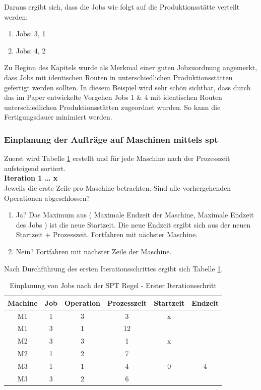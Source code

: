 \documentclass[final, english, ngerman, a4paper, 12pt, %
numbers=noenddot,
cd=true,
cdfont=false,cdfont=nohead,cdfont=nodin,
cdmath=false,
cdhead=false,
cdfoot=true,
cdcover=monochrome,
cdgeometry=symmetric,
declaration=heading,
declaration=notoc,
abstract=heading,
]{tudscrreprt}
\begin{document}
\noindent
Daraus ergibt sich, dass die Jobs wie folgt auf die Produktionsstätte verteilt werden:
\begin{enumerate}
	\item Jobs: {3, 1}
	\item Jobs: {4, 2}
\end{enumerate}

\noindent
Zu Beginn des Kapitels wurde als Merkmal einer guten Jobzuordnung angemerkt, dass Jobs mit identischen Routen in unterschiedlichen Produktionsstätten gefertigt werden sollten. In diesem Beispiel wird sehr schön sichtbar, dass durch das im Paper entwickelte Vorgehen Jobs 1 \& 4 mit identischen Routen unterschiedlichen Produktionsstätten zugeordnet wurden. So kann die Fertigungsdauer minimiert werden.

\subsubsection{Einplanung der Aufträge auf Maschinen mittels \gls{spt} }
Zuerst wird Tabelle \ref{tab:spt1} erstellt und für jede Maschine nach der Prozesszeit aufsteigend sortiert. \\

\noindent
\textbf{Iteration 1 … x} \\
\noindent
Jeweils die erste Zeile pro Maschine betrachten. Sind alle vorhergehenden Operationen abgeschlossen?

\begin{enumerate}
	\item Ja? Das Maximum aus ( Maximale Endzeit der Maschine, Maximale Endzeit des Jobs ) ist die neue Startzeit. Die neue Endzeit ergibt sich aus der neuen Startzeit + Prozesszeit. Fortfahren mit nächster Maschine.
	\item Nein? Fortfahren mit nächster Zeile der Maschine.
\end{enumerate}

\noindent
Nach Durchführung des ersten Iterationsschrittes ergibt sich Tabelle \ref{tab:spt1}.

\begin{table}[H]
	\centering
	\begin{tabular}{c c c c c c}
		\toprule
		Machine & Job & Operation & Prozesszeit & Startzeit & Endzeit\\
		\midrule
		M1 & 1 & 3 & 3 & x &\\
		M1 & 3 & 1 & 12 & &\\
		M2 & 3 & 3 & 1 & x &\\
		M2 & 1 & 2 & 7 & &\\
		M3 & 1 & 1 & 4 & 0 & 4\\
		M3 & 3 & 2 & 6 & &\\
		\bottomrule
	\end{tabular}
	\caption{Einplanung von Jobs nach der SPT Regel - Erster Iterationsschritt}
	\label{tab:spt1}
\end{table}
\end{document}
